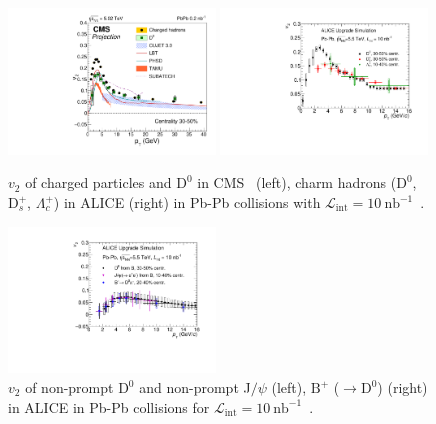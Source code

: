 \begin{figure}[ht]
  \begin{center}
    \includegraphics[width=0.49\textwidth]{hf/figures/cV2_lumiMB_0_wTheory_right.pdf}
   \includegraphics[width=0.49\textwidth]{hf/figures/ALICEUpgrade_charmv2.pdf}
    \caption{$v_{2}$ of charged particles and $\mathrm{D}^{0}$ in CMS~\cite{CMS-PAS-FTR-17-002} (left), charm hadrons ($\mathrm{D}^{0}$, $\mathrm{D}_{s}^{+}$, $\Lambda_{c}^{+}$) in ALICE (right) in Pb-Pb collisions with $\mathcal{L}_{\mathrm{int}}=10~\mathrm{nb}^{-1}$~\cite{Abelev:1625842}.}
    \label{fig:RAAv2.v2charm}
  \end{center}
\end{figure}
\begin{figure}[ht]
  \begin{center}
    \includegraphics[width=0.49\textwidth]{hf/figures/ALICEUpgrade_beautyv2.pdf}
    \caption{$v_{2}$ of non-prompt $\mathrm{D}^{0}$ and non-prompt J$/\psi$ (left), $\mathrm{B}^{+}$ ($\rightarrow \mathrm{D}^{0}$) (right) in ALICE in Pb-Pb collisions for $\mathcal{L}_{\mathrm{int}}=10~\mathrm{nb}^{-1}$~\cite{Abelev:1625842}.}
    \label{fig:RAAv2.v2beauty}
  \end{center}
\end{figure}


